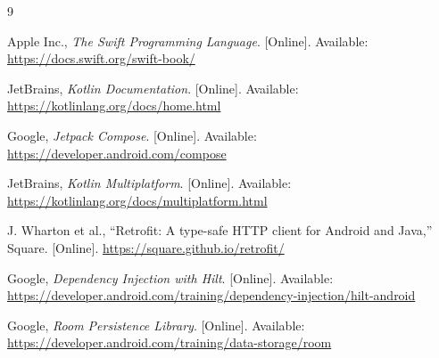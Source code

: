 \begin{thebibliography}{9}
\footnotesize
\setlength{\itemsep}{0pt}
\setlength{\parskip}{0pt}

 Apple Inc., \emph{The Swift Programming Language}. [Online]. Available:
\url{https://docs.swift.org/swift-book/}

 JetBrains, \emph{Kotlin Documentation}. [Online]. Available:
\url{https://kotlinlang.org/docs/home.html}

 Google, \emph{Jetpack Compose}. [Online]. Available:
\url{https://developer.android.com/compose}

 JetBrains, \emph{Kotlin Multiplatform}. [Online]. Available:
\url{https://kotlinlang.org/docs/multiplatform.html}

 J. Wharton et al., ``Retrofit: A type-safe HTTP client for Android and
Java,'' Square. [Online]. \url{https://square.github.io/retrofit/}

 Google, \emph{Dependency Injection with Hilt}. [Online]. Available:
\url{https://developer.android.com/training/dependency-injection/hilt-android}

 Google, \emph{Room Persistence Library}. [Online]. Available:
\url{https://developer.android.com/training/data-storage/room}

\end{thebibliography}


